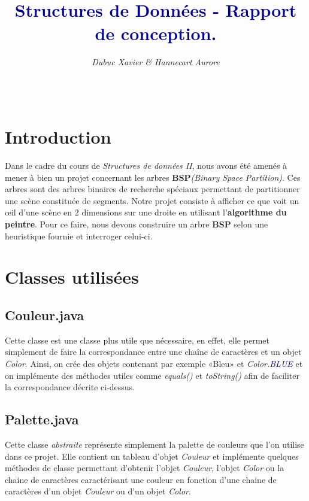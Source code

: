 \documentclass{article}
\title{\textbf{\textcolor{darkblue}{Structures de Données - Rapport de conception.}}}
\author{\textit{Dubuc Xavier \& Hannecart Aurore}}
\newcommand{\blu}[1]{\textcolor{darkblue}{#1}}
\begin{document}
\maketitle

\hbox{\raisebox{0.4em}{\vrule depth 0.4pt height 0.4pt width 10cm}}

\tableofcontents

$ $ \\
\hbox{\raisebox{0.4em}{\vrule depth 0.4pt height 0.4pt width 10cm}}

\newpage

\section{Introduction}

Dans le cadre du cours de \textit{Structures de données II}, nous avons été amenés à mener à bien un 
projet concernant les arbres \textbf{BSP}\textit{(Binary Space Partition)}. Ces arbres sont des 
arbres binaires de recherche spéciaux permettant de partitionner une scène constituée de segments. 
Notre projet consiste à afficher ce que voit un \oe il d'une scène en 2 dimensions sur une droite en 
utilisant l'\textbf{algorithme du peintre}. Pour ce faire, nous devons construire un arbre 
\textbf{BSP} selon une heuristique fournie et interroger celui-ci.

\section{Classes utilisées}

\subsection{Couleur.java}

Cette classe est une classe plus utile que nécessaire, en effet, elle permet simplement de faire la 
correspondance entre une chaîne de caractères et un objet \textit{Color}. Ainsi, on crée des objets 
contenant par exemple «Bleu» et \textit{Color.\blu{BLUE}} et on implémente des méthodes utiles comme 
\textit{equals()} et \textit{toString()} afin de faciliter la correspondance décrite ci-dessus.

\subsection{Palette.java}

Cette classe \textit{abstraite} représente simplement la palette de couleurs que l'on utilise dans 
ce projet. Elle contient un tableau d'objet \textit{Couleur} et implémente quelques méthodes de 
classe permettant d'obtenir l'objet \textit{Couleur}, l'objet \textit{Color} ou la chaine de 
caractères caractérisant une couleur en fonction d'une chaine de caractères d'un objet 
\textit{Couleur} ou d'un objet \textit{Color}.
\end{document}
